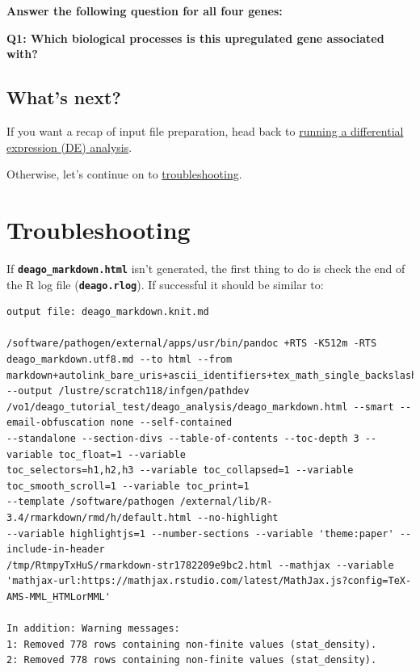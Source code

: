 \documentclass[11pt]{article}
\begin{document}
\textbf{Answer the following question for all four genes:}

\textbf{Q1: Which biological processes is this upregulated gene
associated with?}

    \hypertarget{whats-next}{%
\subsection{What's next?}\label{whats-next}}

If you want a recap of input file preparation, head back to
\href{differential-expression.ipynb}{running a differential expression
(DE) analysis}.

Otherwise, let's continue on to
\href{troubleshooting.ipynb}{troubleshooting}.





\newpage






    \hypertarget{troubleshooting}{%
\section{Troubleshooting}\label{troubleshooting}}

    If \textbf{\texttt{deago\_markdown.html}} isn't generated, the first
thing to do is check the end of the R log file
(\textbf{\texttt{deago.rlog}}). If successful it should be similar to:

\begin{verbatim}
output file: deago_markdown.knit.md

/software/pathogen/external/apps/usr/bin/pandoc +RTS -K512m -RTS deago_markdown.utf8.md --to html --from
markdown+autolink_bare_uris+ascii_identifiers+tex_math_single_backslash --output /lustre/scratch118/infgen/pathdev
/vo1/deago_tutorial_test/deago_analysis/deago_markdown.html --smart --email-obfuscation none --self-contained
--standalone --section-divs --table-of-contents --toc-depth 3 --variable toc_float=1 --variable
toc_selectors=h1,h2,h3 --variable toc_collapsed=1 --variable toc_smooth_scroll=1 --variable toc_print=1
--template /software/pathogen /external/lib/R-3.4/rmarkdown/rmd/h/default.html --no-highlight
--variable highlightjs=1 --number-sections --variable 'theme:paper' --include-in-header
/tmp/RtmpyTxHuS/rmarkdown-str1782209e9bc2.html --mathjax --variable
'mathjax-url:https://mathjax.rstudio.com/latest/MathJax.js?config=TeX-AMS-MML_HTMLorMML'

In addition: Warning messages:
1: Removed 778 rows containing non-finite values (stat_density).
2: Removed 778 rows containing non-finite values (stat_density).
\end{verbatim}
\end{document}
